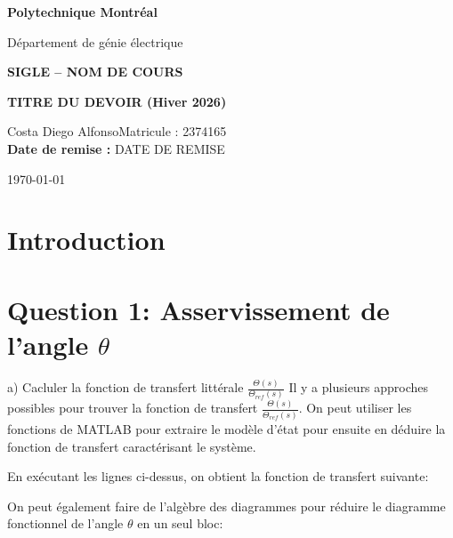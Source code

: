 \documentclass[11pt]{article}
\begin{document}
    \begin{titlepage}
        \centering
        \vspace*{2cm}
        {\LARGE \textbf{Polytechnique Montréal}\par}
        \vspace{0.5cm}
        {\Large Département de génie électrique\par}
        \vspace{2cm}
        {\Huge \textbf{SIGLE -- NOM DE COURS}\par}
        \vspace{0.5cm}
        {\Huge \textbf{TITRE DU DEVOIR (Hiver 2026)}\par}
        \vspace{2cm}

        \begin{flushleft}
            Costa Diego Alfonso\hfill Matricule : 2374165\\
            \vspace{0.8cm}
            \textbf{Date de remise :} DATE DE REMISE\\
        \end{flushleft}

        \vfill
        {\large \today\par}
    \end{titlepage}


    \tableofcontents
    \clearpage

    \section{Introduction}
    \section{Question 1: Asservissement de l'angle $\theta$}
    a) Cacluler la fonction de transfert littérale $\frac{\Theta(s)}{\Theta_{ref}(s)}$ \newline
    Il y a plusieurs approches possibles pour trouver la fonction de transfert $\frac{\Theta(s)}{\Theta_{ref}(s)}$. On peut utiliser les fonctions de MATLAB pour extraire le modèle d'état pour ensuite en déduire la fonction de transfert caractérisant le système. 
    
    

    En exécutant les lignes ci-dessus, on obtient la fonction de transfert suivante: \newline 
    \begin{center}
        \Large {}
    \end{center}
    On peut également faire de l'algèbre des diagrammes pour réduire le diagramme fonctionnel de l'angle $\theta$ en un seul bloc: \newline \newline
\end{document}
